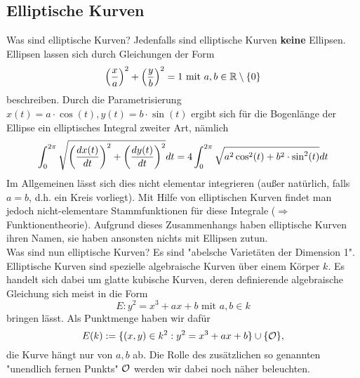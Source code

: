\subsection*{Elliptische Kurven}
Was sind elliptische Kurven? Jedenfalls sind elliptische Kurven \textbf{keine} Ellipsen. Ellipsen lassen sich durch Gleichungen der Form
\[ \enbrace*{\frac{x}{a}}^2 + \enbrace*{\frac{y}{b}}^2 = 1 \text{ mit } a,b \in \RR \setminus \setnull \]
beschreiben. Durch die Parametrisierung $x(t) = a \cdot \cos(t), y(t) = b \cdot \sin(t)$ ergibt sich für die Bogenlänge der Ellipse ein elliptisches Integral zweiter Art, nämlich
\[ \int_{0}^{2\pi} \sqrt{ \enbrace*{\frac{dx(t)}{dt}}^2 + \enbrace*{\frac{dy(t)}{dt}}^2 } dt = 4 \int_{0}^{2\pi} \sqrt{ a^2 \cos^2(t) + b^2 \cdot \sin^2 (t)} dt \]
Im Allgemeinen lässt sich dies nicht elementar integrieren (außer natürlich, falls $a = b$, d.h. ein Kreis vorliegt). Mit Hilfe von elliptischen Kurven findet man jedoch nicht-elementare Stammfunktionen für diese Integrale ($\Rightarrow$ Funktionentheorie). Aufgrund dieses Zusammenhangs haben elliptische Kurven ihren Namen, sie haben ansonsten nichts mit Ellipsen zutun. \\

Was sind nun elliptische Kurven? Es sind "abelsche Varietäten der Dimension 1". Elliptische Kurven sind spezielle algebraische Kurven über einem Körper $k$. Es handelt sich dabei um glatte kubische Kurven, deren definierende algebraische Gleichung sich meist in die Form
\[ E \colon y^2 = x^3 + ax + b \text{ mit } a,b \in k \]
bringen lässt. Als Punktmenge haben wir dafür
\[ E(k) := \{ (x,y) \in k^2 : y^2 = x^3 + ax + b\} \cup \{ \oh \}, \]
die Kurve hängt nur von $a,b$ ab. Die Rolle des zusätzlichen so genannten "unendlich fernen Punkts" $\oh$ werden wir dabei noch näher beleuchten. \\

